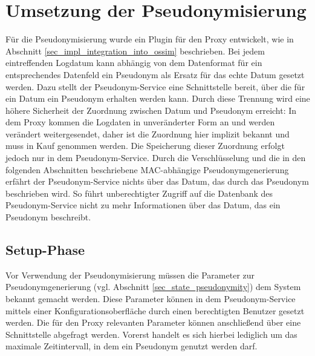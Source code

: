 \section{Umsetzung der Pseudonymisierung} %

\label{sec_impl_pseudonymity}






Für die Pseudonymisierung wurde ein Plugin für den Proxy entwickelt, wie in Abschnitt \ref{sec_impl_integration_into_ossim} beschrieben. Bei jedem eintreffenden Logdatum kann abhängig von dem Datenformat für ein entsprechendes Datenfeld ein Pseudonym als Ersatz für das echte Datum gesetzt werden. Dazu stellt der Pseudonym-Service eine Schnittstelle bereit, über die für ein Datum ein Pseudonym erhalten werden kann. Durch diese Trennung wird eine höhere Sicherheit der Zuordnung zwischen Datum und Pseudonym erreicht: In dem Proxy kommen die Logdaten in unveränderter Form an und werden verändert weitergesendet, daher ist die Zuordnung hier implizit bekannt und muss in Kauf genommen werden. Die Speicherung dieser Zuordnung erfolgt jedoch nur in dem Pseudonym-Service. Durch die Verschlüsselung und die in den folgenden Abschnitten beschriebene MAC-abhängige Pseudonymgenerierung erfährt der Pseudonym-Service nichts über das Datum, das durch das Pseudonym beschrieben wird. So führt unberechtigter Zugriff auf die Datenbank des Pseudonym-Service nicht zu mehr Informationen über das Datum, das ein Pseudonym beschreibt.

\subsection{Setup-Phase}

Vor Verwendung der Pseudonymisierung müssen die Parameter zur Pseudonymgenerierung (vgl. Abschnitt \ref{sec_state_pseudonymity}) dem System bekannt gemacht werden. Diese Parameter können in dem Pseudonym-Service mittels einer Konfigurationsoberfläche durch einen berechtigten Benutzer gesetzt werden. Die für den Proxy relevanten Parameter können anschließend über eine Schnittstelle abgefragt werden. Vorerst handelt es sich hierbei lediglich um das maximale Zeitintervall, in dem ein Pseudonym genutzt werden darf.

